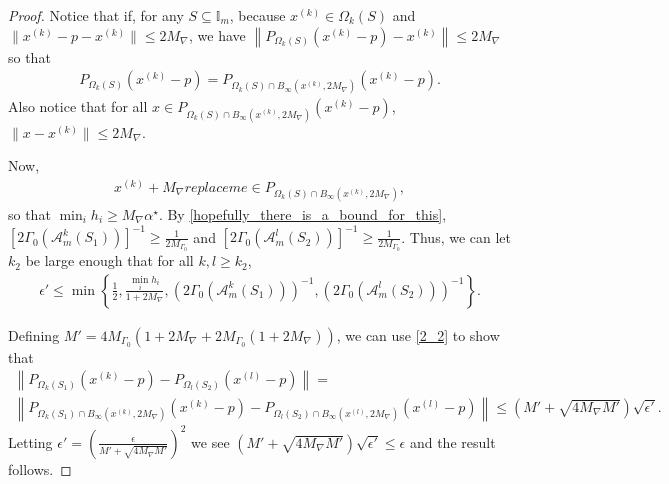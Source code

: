 \documentclass{article}
\theoremstyle{case}
\numberwithin{theorem}{subsection}
\newcommand{\huff}{{\Gamma_0}}
\newcommand{\maxgrad}{{M_{\nabla}}}
\newcommand{\minanglealpha}{{ \alpha^{\star} }}
\newcommand{\xk}{x^{(k)}}
\newcommand{\minangleu}{{replace me}}
\begin{document}
\begin{proof}
Notice that if, for any $S \subseteq \mathbb I_m$,
because $\xk \in \Omega_k(S)$ and $\|\xk - p - \xk\| \le 2\maxgrad $, we have
$\left\|P_{\Omega_k(S)}\left(\xk - p \right) - \xk \right\| \le 2\maxgrad$
so that 
\begin{align*}
P_{\Omega_k(S)                 							  }\left(\xk - p \right) = 
P_{\Omega_k(S) \cap B_{\infty}\left(\xk, 2\maxgrad\right) }\left(\xk - p\right).
\end{align*}
Also notice that for all $x \in P_{\Omega_k(S) \cap B_{\infty}\left(\xk, 2\maxgrad\right) }\left(\xk - p\right)$,
$\|x - \xk\| \le 2\maxgrad$.

Now, 
\begin{align*}
\xk + \maxgrad \minangleu \in P_{\Omega_k(S) \cap B_{\infty}\left(\xk, 2\maxgrad\right) },
\end{align*}
so that $\min_i h_i \ge \maxgrad \minanglealpha$.
By \cref{hopefully_there_is_a_bound_for_this},
$\left[2\huff\left(\mathcal A^k_m\left(S_1\right)\right)\right]^{-1} \ge \frac 1 {2M_{\Gamma_0}}$ and
$\left[2\huff\left(\mathcal A^l_m\left(S_2\right)\right)\right]^{-1} \ge \frac 1 {2M_{\Gamma_0}}$.
Thus, we can let $k_2$ be large enough that for all $k, l \ge k_2$,
\begin{align*}
\epsilon' \le \min\left\{
\frac 1 2,
\frac{\min_i h_i}{1 + 2\maxgrad},
\left(2\huff\left(\mathcal A^k_m\left(S_1\right)\right)\right)^{-1},
\left(2\huff\left(\mathcal A^l_m\left(S_2\right)\right)\right)^{-1}\right\}.
\end{align*}

Defining $M' = 4M_{\Gamma_0}\left(1 + 2\maxgrad + 2M_{\Gamma_0}\left(1 + 2\maxgrad\right)\right)$, 
we can use \cref{2_2} to show that
\begin{align*}
\left\| 
  P_{\Omega_k(S_1)}\left(\xk - p\right) - P_{\Omega_l(S_2)}\left(x^{(l)} - p \right)
\right\| = \\
\left\| 
  P_{\Omega_k(S_1) \cap B_{\infty}\left(\xk, 2\maxgrad\right)}\left(\xk - p\right) - P_{\Omega_l(S_2) \cap B_{\infty}\left(x^{(l)}, 2\maxgrad\right)}\left(x^{(l)} - p \right)
\right\| \le \left( M' + \sqrt{4\maxgrad M'}\right)\sqrt{\epsilon'}.
\end{align*}
Letting 
$\epsilon' = \left(\frac{\epsilon}{ M' + \sqrt{4\maxgrad M'}}\right)^2$
we see
$ \left( M' + \sqrt{4\maxgrad M'}\right)\sqrt{\epsilon'} \le \epsilon$
and the result follows.
\end{proof}
\end{document}
